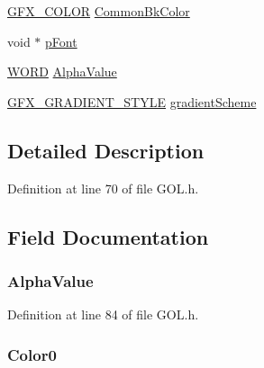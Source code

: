 \begin{DoxyCompactItemize}
\item 
\hyperlink{gfxcolors_8h_a0658edb6e7bd88d6e9a185711893441c}{G\+F\+X\+\_\+\+C\+O\+L\+O\+R} \hyperlink{struct_g_o_l___s_c_h_e_m_e_a4c03516323c4e87003e93d0625887773}{Common\+Bk\+Color}
\item 
void $\ast$ \hyperlink{struct_g_o_l___s_c_h_e_m_e_a4a1009bfded2760eeec21b35ed171151}{p\+Font}
\item 
\hyperlink{_generic_type_defs_8h_a2b0e863dadf920709ec53d9088ee7c91}{W\+O\+R\+D} \hyperlink{struct_g_o_l___s_c_h_e_m_e_a3d95f8c2197d168e8a10b62c72a4135d}{Alpha\+Value}
\item 
\hyperlink{struct_g_f_x___g_r_a_d_i_e_n_t___s_t_y_l_e}{G\+F\+X\+\_\+\+G\+R\+A\+D\+I\+E\+N\+T\+\_\+\+S\+T\+Y\+L\+E} \hyperlink{struct_g_o_l___s_c_h_e_m_e_a8f1b7f9b90b9790237e982d0938438ed}{gradient\+Scheme}
\end{DoxyCompactItemize}


\subsection{Detailed Description}


Definition at line 70 of file G\+O\+L.\+h.



\subsection{Field Documentation}
\hypertarget{struct_g_o_l___s_c_h_e_m_e_a3d95f8c2197d168e8a10b62c72a4135d}{}
\subsubsection[{Alpha\+Value}]{ Alpha\+Value}\label{struct_g_o_l___s_c_h_e_m_e_a3d95f8c2197d168e8a10b62c72a4135d}


Definition at line 84 of file G\+O\+L.\+h.

\hypertarget{struct_g_o_l___s_c_h_e_m_e_aa4bb98879942a5f1184f69062fa7450c}{}
\subsubsection[{Color0}]{ Color0}\label{struct_g_o_l___s_c_h_e_m_e_aa4bb98879942a5f1184f69062fa7450c}



